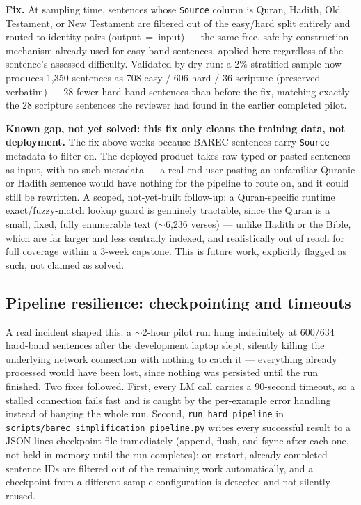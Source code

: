 \documentclass[11pt,a4paper]{article}
\begin{document}
\textbf{Fix.} At sampling time, sentences whose \texttt{Source} column is
Quran, Hadith, Old Testament, or New Testament are filtered out of the
easy/hard split entirely and routed to identity pairs (output~=~input) ---
the same free, safe-by-construction mechanism already used for easy-band
sentences, applied here regardless of the sentence's assessed difficulty.
Validated by dry run: a 2\% stratified sample now produces 1,350 sentences
as 708 easy / 606 hard / 36 scripture (preserved verbatim) --- 28 fewer
hard-band sentences than before the fix, matching exactly the 28 scripture
sentences the reviewer had found in the earlier completed pilot.

\begin{noteb}
\textbf{Known gap, not yet solved: this fix only cleans the training data,
not deployment.} The fix above works because BAREC sentences carry
\texttt{Source} metadata to filter on. The deployed product takes raw
typed or pasted sentences as input, with no such metadata --- a real end
user pasting an unfamiliar Quranic or Hadith sentence would have nothing
for the pipeline to route on, and it could still be rewritten. A scoped,
not-yet-built follow-up: a Quran-specific runtime exact/fuzzy-match lookup
guard is genuinely tractable, since the Quran is a small, fixed, fully
enumerable text ($\sim$6,236 verses) --- unlike Hadith or the Bible, which
are far larger and less centrally indexed, and realistically out of reach
for full coverage within a 3-week capstone. This is future work, explicitly
flagged as such, not claimed as solved.
\end{noteb}

\subsection{Pipeline resilience: checkpointing and timeouts}
\label{sec:resilience}

A real incident shaped this: a $\sim$2-hour pilot run hung indefinitely at
600/634 hard-band sentences after the development laptop slept, silently
killing the underlying network connection with nothing to catch it ---
everything already processed would have been lost, since nothing was
persisted until the run finished. Two fixes followed. First, every LM call
carries a 90-second timeout, so a stalled connection fails fast and is
caught by the per-example error handling instead of hanging the whole run.
Second, \texttt{run\_hard\_pipeline} in
\texttt{scripts/barec\_simplification\_pipeline.py} writes every successful
result to a JSON-lines checkpoint file immediately (append, flush, and
fsync after each one, not held in memory until the run completes); on
restart, already-completed sentence IDs are filtered out of the remaining
work automatically, and a checkpoint from a different sample configuration
is detected and not silently reused.
\end{document}

